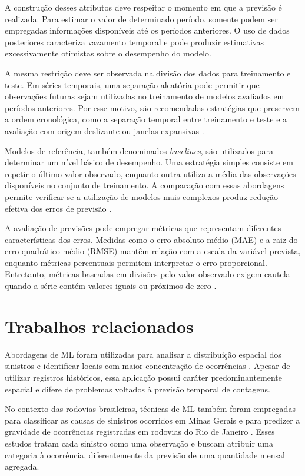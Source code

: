 \documentclass[12pt]{article}
\begin{document}
A construção desses atributos deve respeitar o momento em que a previsão é realizada. Para estimar o valor de determinado período, somente podem ser empregadas informações disponíveis até os períodos anteriores. O uso de dados posteriores caracteriza vazamento temporal e pode produzir estimativas excessivamente otimistas sobre o desempenho do modelo.

A mesma restrição deve ser observada na divisão dos dados para treinamento e teste. Em séries temporais, uma separação aleatória pode permitir que observações futuras sejam utilizadas no treinamento de modelos avaliados em períodos anteriores. Por esse motivo, são recomendadas estratégias que preservem a ordem cronológica, como a separação temporal entre treinamento e teste e a avaliação com origem deslizante ou janelas expansivas \cite{bergmeir2018crossvalidation,hyndman2021forecasting}.

Modelos de referência, também denominados \textit{baselines}, são utilizados para determinar um nível básico de desempenho. Uma estratégia simples consiste em repetir o último valor observado, enquanto outra utiliza a média das observações disponíveis no conjunto de treinamento. A comparação com essas abordagens permite verificar se a utilização de modelos mais complexos produz redução efetiva dos erros de previsão \cite{hyndman2021forecasting}.

A avaliação de previsões pode empregar métricas que representam diferentes características dos erros. Medidas como o erro absoluto médio (MAE) e a raiz do erro quadrático médio (RMSE) mantêm relação com a escala da variável prevista, enquanto métricas percentuais permitem interpretar o erro proporcional. Entretanto, métricas baseadas em divisões pelo valor observado exigem cautela quando a série contém valores iguais ou próximos de zero \cite{hyndman2006measures}.

\section{Trabalhos relacionados}

Abordagens de ML foram utilizadas para analisar a distribuição espacial dos sinistros e identificar locais com maior concentração de ocorrências \cite{santos2021machine}. Apesar de utilizar registros históricos, essa aplicação possui caráter predominantemente espacial e difere de problemas voltados à previsão temporal de contagens.

No contexto das rodovias brasileiras, técnicas de ML também foram empregadas para classificar as causas de sinistros ocorridos em Minas Gerais \cite{silva2024classificacao} e para predizer a gravidade de ocorrências registradas em rodovias do Rio de Janeiro \cite{mafort2025tecnicas}. Esses estudos tratam cada sinistro como uma observação e buscam atribuir uma categoria à ocorrência, diferentemente da previsão de uma quantidade mensal agregada.
\end{document}
